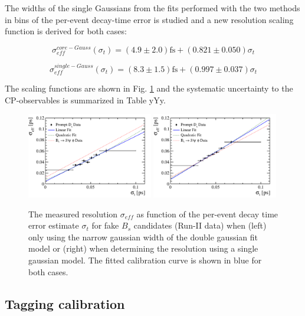 The widths of the single Gaussians from the fits performed with the two methods in bins of the per-event decay-time error is studied and a new resolution scaling function is derived for both cases: \newline

\begin{equation}
\sigma_{eff}^{core-Gauss}(\sigma_t) = \left(4.9  \pm 2.0 \right) \text{fs} + \left( 0.821 \pm 0.050 \right) \sigma_t
\label{eq:ResoSyst1}
\end{equation}

\begin{equation}
\sigma_{eff}^{single-Gauss}(\sigma_t) = \left(8.3  \pm 1.5 \right) \text{fs} + \left( 0.997 \pm 0.037 \right) \sigma_t
\label{eq:ResoSyst2}
\end{equation}

The scaling functions are shown in Fig. \ref{fig:SystscaleFactor} and the systematic uncertainty to the CP-observables is summarized in Table yYy.


    
\begin{figure}[h]
\centering
\includegraphics[height=!,width=0.49\textwidth]{figs/Resolution/ScaleFactor_Data_coreGauss.pdf}
\includegraphics[height=!,width=0.49\textwidth]{figs/Resolution/ScaleFactor_Data_singleGauss.pdf}
\caption{The measured resolution $\sigma_{eff}$ as function of the per-event decay time error estimate $\sigma_t$ for fake $B_s$ candidates (Run-II data) 
when (left) only using the narrow gaussian width of the double gaussian fit model or (right) when determining the resolution using a single gaussian model.
The fitted calibration curve is shown in blue for both cases.}
\label{fig:SystscaleFactor}
\end{figure}


\subsection{Tagging calibration}
